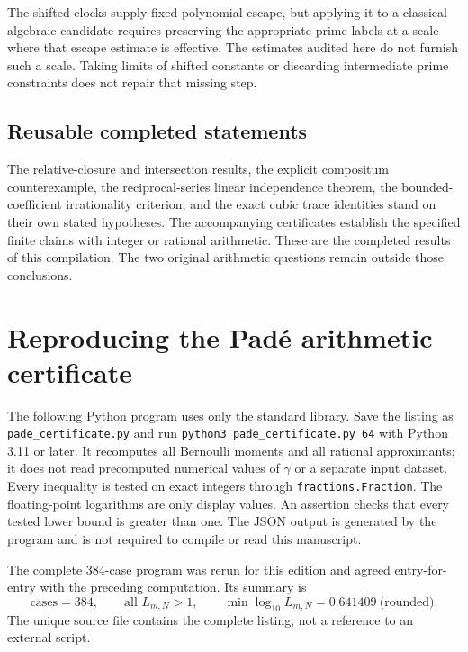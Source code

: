 \documentclass[11pt,a4paper]{article}
\numberwithin{equation}{section}
\theoremstyle{definition}
\theoremstyle{remark}
\begin{document}
The shifted clocks supply fixed-polynomial escape, but applying it to a
classical algebraic candidate requires preserving the appropriate prime
labels at a scale where that escape estimate is effective.  The estimates
audited here do not furnish such a scale.  Taking limits of shifted
constants or discarding intermediate prime constraints does not repair
that missing step.

\subsection{Reusable completed statements}

The relative-closure and intersection results, the explicit compositum
counterexample, the reciprocal-series linear independence theorem, the
bounded-coefficient irrationality criterion, and the exact cubic trace
identities stand on their own stated hypotheses.  The accompanying
certificates establish the specified finite claims with integer or
rational arithmetic.  These are the completed results of this
compilation.  The two original arithmetic questions remain outside those
conclusions.

\appendix
\section{Reproducing the Pad\'e arithmetic certificate}
\label{app:pade}

The following Python program uses only the standard library.  Save the
listing as \texttt{pade\_certificate.py} and run
\texttt{python3 pade\_certificate.py 64} with Python 3.11 or later.
It recomputes all Bernoulli moments and all rational approximants; it
does not read precomputed numerical values of $\gamma$ or a separate
input dataset.  Every inequality is tested on exact integers through
\texttt{fractions.Fraction}.  The floating-point logarithms are only
display values.  An assertion checks that every tested lower bound is
greater than one.  The JSON output is generated by the program and is
not required to compile or read this manuscript.

The complete 384-case program was rerun for this edition and agreed
entry-for-entry with the preceding computation.  Its summary is
\[
 \text{cases}=384,\qquad
 \text{all }L_{m,N}>1,\qquad
 \min\log_{10}L_{m,N}=0.641409\ \text{(rounded)}.
\]
The unique source file contains the complete listing, not a reference to
an external script.
\end{document}
